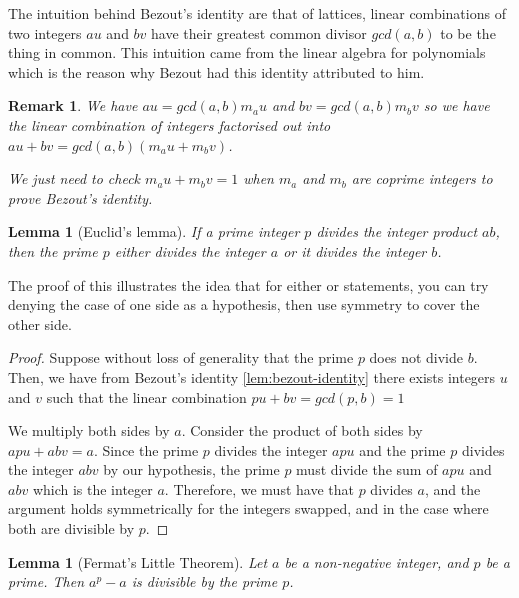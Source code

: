 \documentclass{tufte-book}
\newtheorem{lemma}[theorem]{Lemma}
\newtheorem{remark}[theorem]{Remark}
\begin{document}
The intuition behind Bezout's identity are that of lattices, linear combinations of two integers $au$ and $bv$ have their greatest common divisor $gcd(a,b)$ to be the thing in common. This intuition came from the linear algebra for polynomials which is the reason why Bezout had this identity attributed to him.

\begin{remark}
	We have $a u = gcd(a,b) m_a u$ and $b v = gcd(a,b) m_b v$ so we have the linear combination of integers factorised out into $au + bv = gcd(a,b)(m_a u + m_b v)$. 
	
	We just need to check $m_a u + m_b v = 1$ when $m_a$ and $m_b$ are coprime integers to prove Bezout's identity.
\end{remark}

\begin{lemma}[Euclid's lemma]
	If a prime integer $p$ divides the integer product $ab$, then the prime $p$ either divides the integer $a$ or it divides the integer $b$.
\end{lemma}

The proof of this illustrates the idea that for either or statements, you can try denying the case of one side as a hypothesis, then use symmetry to cover the other side.

\begin{proof}
	Suppose without loss of generality that the prime $p$ does not divide $b$. Then, we have 
	from Bezout's identity \ref{lem:bezout-identity} there exists integers $u$ and $v$ such that the linear combination $pu + bv = gcd(p,b) = 1$
	
	We multiply both sides by $a$.
	Consider the product of both sides by $apu + abv = a$. Since the prime $p$ divides the integer $apu$ and the prime $p$ divides the integer $abv$ by our hypothesis, the prime $p$ must divide the sum of $apu$ and $abv$ which is the integer $a$. Therefore, we must have that $p$ divides $a$, and the argument holds symmetrically for the integers swapped, and in the case where both are divisible by $p$.
\end{proof}

\begin{lemma}[Fermat's Little Theorem]
  Let $a$ be a non-negative integer, and $p$ be a prime.
  Then $a^p - a$ is divisible by the prime $p$. 
\end{lemma}
\end{document}
